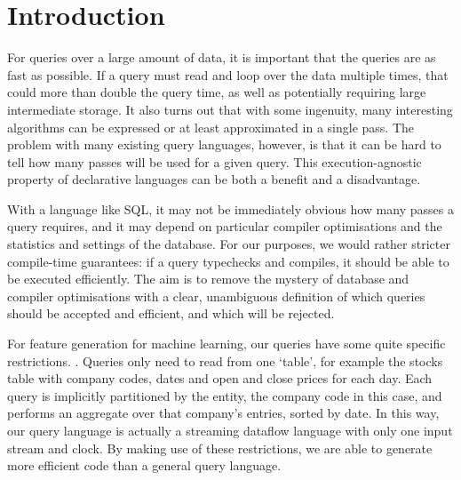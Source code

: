 \section{Introduction}
\label{s:Introduction}

For queries over a large amount of data, it is important that the queries are as fast as possible.
If a query must read and loop over the data multiple times, that could more than double the query time, as well as potentially requiring large intermediate storage.
It also turns out that with some ingenuity, many interesting algorithms can be expressed or at least approximated in a single pass.
The problem with many existing query languages, however, is that it can be hard to tell how many passes will be used for a given query.
This execution-agnostic property of declarative languages can be both a benefit and a disadvantage.

With a language like SQL, it may not be immediately obvious how many passes a query requires, and it may depend on particular compiler optimisations and the statistics and settings of the database.
For our purposes, we would rather stricter compile-time guarantees: if a query typechecks and compiles, it should be able to be executed efficiently.
The aim is to remove the mystery of database and compiler optimisations with a clear, unambiguous definition of which queries should be accepted and efficient, and which will be rejected.


For feature generation for machine learning, our queries have some quite specific restrictions. .
Queries only need to read from one `table', for example the stocks table with company codes, dates and open and close prices for each day.
Each query is implicitly partitioned by the entity, the company code in this case, and performs an aggregate over that company's entries, sorted by date.
In this way, our query language is actually a streaming dataflow language with only one input stream and clock.
By making use of these restrictions, we are able to generate more efficient code than a general query language.

